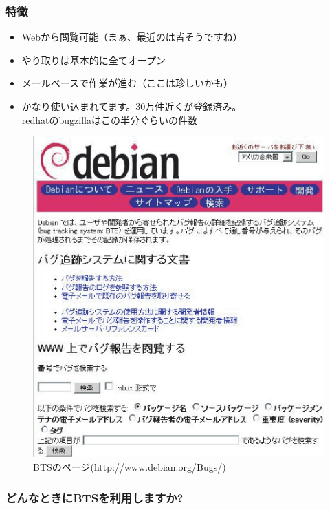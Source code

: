 \documentclass[mingoth,a4paper]{jsarticle}
\begin{document}
\subsubsection*{特徴}

\begin{itemize}
\item Webから閲覧可能（まぁ、最近のは皆そうですね）
\item やり取りは基本的に全てオープン
\item メールベースで作業が進む（ここは珍しいかも）
\item かなり使い込まれてます。30万件近くが登録済み。\\
redhatのbugzillaはこの半分ぐらいの件数
\end{itemize}

\begin{figure}[htbp]
\begin{center}
\includegraphics{image200508/bts.eps}
\end{center}
\caption{BTSのページ(http://www.debian.org/Bugs/)}
\label{bts-webpage}
\end{figure}

\subsubsection{どんなときにBTSを利用しますか?}
\end{document}
